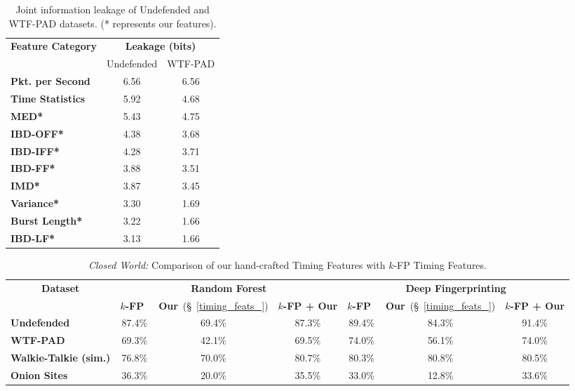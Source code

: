 \documentclass[USenglish,oneside,twocolumn]{article}
\begin{document}
\begin{table}[tbp]
\renewcommand{\arraystretch}{1.2}
  \begin{center}
      \caption{Joint information leakage of Undefended and WTF-PAD datasets. (* represents our features).}\vskip -0.2cm
    \label{tab:jointleak}
    \begin{tabular}{l c c}
\multirow{2}{*}{\textbf{Feature Category}} & \multicolumn{2}{c}{\textbf{Leakage (bits)}} \\ \cline{2-3}
    & Undefended & WTF-PAD \\
    \hline \textbf{Pkt. per Second} & 6.56 & 6.56\\
        \textbf{Time Statistics} & 5.92 & 4.68\\
        \textbf{MED*} & 5.43 & 4.75\\
        \textbf{IBD-OFF*} & 4.38 & 3.68\\
        \textbf{IBD-IFF*} & 4.28 & 3.71\\
        \textbf{IBD-FF*} & 3.88 & 3.51\\
        \textbf{IMD*} & 3.87 & 3.45\\
        \textbf{Variance*} & 3.30 & 1.69\\
        \textbf{Burst Length*} & 3.22 & 1.66\\
        \textbf{IBD-LF*} & 3.13 & 1.66\\

    \hline \end{tabular}
  \end{center}
\end{table} 
\begin{table*}[th!]
\renewcommand{\arraystretch}{1.25}
  \begin{center}\vskip -0.3cm
      \caption{{\em Closed World:} Comparison of our hand-crafted Timing Features with $k$-FP Timing Features. }
\vskip -0.2cm
    \label{tab:cw_k_fp}
    \begin{tabular}{l c c c | c c c}


    \multicolumn{1}{c}{\multirow{2}{*}{\textbf{Dataset}}}           & \multicolumn{3}{c|}{\textbf{Random Forest}} & \multicolumn{3}{c}{\textbf{Deep Fingerprinting}} \\ \cline{2-7}
    
     & \textbf{$k$-FP}~\cite{hayes2016k} & \textbf{Our}~(\S~\ref{timing_feats_}) & \textbf{$k$-FP + Our} &  \textbf{$k$-FP}~\cite{hayes2016k} & \textbf{Our}~(\S~\ref{timing_feats_}) & \textbf{$k$-FP + Our}\\
    \hline \textbf{Undefended} & 87.4\% & 69.4\%  & 87.3\%  & 89.4\% & 84.3\% & 91.4\% \\
\textbf{WTF-PAD}  & 69.3\% & 42.1\%  & 69.5\%  & 74.0\% & 56.1\% & 74.0\% \\
\textbf{Walkie-Talkie (sim.)}  & 76.8\% & 70.0\%  & 80.7\%  & 80.3\% & 80.8\% & 80.5\% \\
\textbf{Onion Sites}  & 36.3\% &  20.0\%  & 35.5\%  & 33.0\% & 12.8\% & 33.6\% \\
    \hline \end{tabular}\vskip -0.3cm
  \end{center}
\end{table*}
\end{document}
